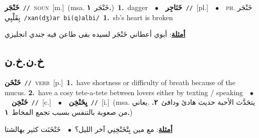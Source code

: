 \documentclass[10pt,a4paper,twoside]{article} %
\begin{document}
\begin{multicols}{2}
{\setlength\topsep{0pt}\textbf{\foreignlanguage{arabic}{خَنْجَر}}\ {\color{gray}\texttt{//}\color{black}}\ \textsc{noun}\ [m.]\ \color{gray}(msa. \foreignlanguage{arabic}{خَنْجَر}~\foreignlanguage{arabic}{\textbf{١.}})\color{black}\ \textbf{1.}~dagger\ \ $\bullet$\ \ \setlength\topsep{0pt}\textbf{\foreignlanguage{arabic}{خَنَاجِر}}\ {\color{gray}\texttt{//}\color{black}}\ [pl.]\ \ $\bullet$\ \ \textsc{ph.} \color{gray} \foreignlanguage{arabic}{خَنْجَر بِقَلْبِي}\color{black}\ {\color{gray}\texttt{/{\sffamily xan(dʒ)ar bi(q)albi}/}\color{black}}\ \textbf{1.}~sb's heart is broken\  \begin{flushright}\color{gray}\foreignlanguage{arabic}{\textbf{\underline{\foreignlanguage{arabic}{أمثلة}}}: أبوي أعطاني خَنْجَر لسيده بقى طاعن فيه جندي انجليزي}\end{flushright}\color{black}} \vspace{2mm}

\vspace{-3mm}
\subsection*{\color{blue}\foreignlanguage{arabic}{خ.ن.خ.ن}\color{blue}{}} 

{\setlength\topsep{0pt}\textbf{\foreignlanguage{arabic}{خَنْخَن}}\ {\color{gray}\texttt{//}\color{black}}\ \textsc{verb}\ [p.]\ \textbf{1.}~have shortness or difficulty of breath because of the mucus.  \textbf{2.}~have a cosy tete-a-tete between lovers either by texting / speaking\ \ $\bullet$\ \ \setlength\topsep{0pt}\textbf{\foreignlanguage{arabic}{خَنْخِن}}\ {\color{gray}\texttt{//}\color{black}}\ [c.]\ \ $\bullet$\ \ \setlength\topsep{0pt}\textbf{\foreignlanguage{arabic}{يِخَنْخِن}}\ {\color{gray}\texttt{//}\color{black}}\ [i.]\ \color{gray}(msa. \foreignlanguage{arabic}{يتحَدَّث الأحبة حديث هادئ ودافئ}~\foreignlanguage{arabic}{\textbf{٢.}}  .\foreignlanguage{arabic}{يعاني من صعوبة بالتنفس بسبب تجمع المخاط}~\foreignlanguage{arabic}{\textbf{١.}})\color{black}\  \begin{flushright}\color{gray}\foreignlanguage{arabic}{\textbf{\underline{\foreignlanguage{arabic}{أمثلة}}}: مع مين بِتْخَنْخِنِي آخر الليل؟\ $\bullet$\ \  خَنْخَنَت كثير بهالشتا}\end{flushright}\color{black}} \vspace{2mm}


\end{multicols}
\end{document}
